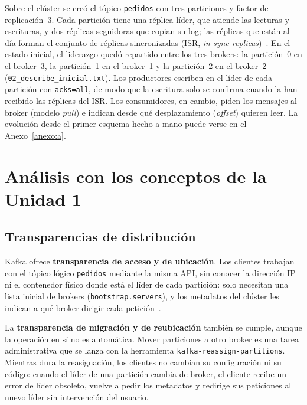\documentclass[12pt,a4paper]{article}
\begin{document}
Sobre el clúster se creó el tópico \texttt{pedidos} con tres particiones y factor de replicación~3. Cada partición tiene una réplica líder, que atiende las lecturas y escrituras, y dos réplicas seguidoras que copian su log; las réplicas que están al día forman el conjunto de réplicas sincronizadas (ISR, \textit{in-sync replicas})~\cite{Wang2015}. En el estado inicial, el liderazgo quedó repartido entre los tres brokers: la partición~0 en el broker~3, la partición~1 en el broker~1 y la partición~2 en el broker~2 (\texttt{02\_describe\_inicial.txt}). Los productores escriben en el líder de cada partición con \texttt{acks=all}, de modo que la escritura solo se confirma cuando la han recibido las réplicas del ISR. Los consumidores, en cambio, piden los mensajes al broker (modelo \textit{pull}) e indican desde qué desplazamiento (\textit{offset}) quieren leer. La evolución desde el primer esquema hecho a mano puede verse en el Anexo~\ref{anexo:a}.

\section{Análisis con los conceptos de la Unidad 1}\label{sec:unidad1}

\subsection{Transparencias de distribución}
Kafka ofrece \textbf{transparencia de acceso y de ubicación}. Los clientes trabajan con el tópico lógico \texttt{pedidos} mediante la misma API, sin conocer la dirección IP ni el contenedor físico donde está el líder de cada partición: solo necesitan una lista inicial de brokers (\texttt{bootstrap.servers}), y los metadatos del clúster les indican a qué broker dirigir cada petición~\cite{Raptis2023}.

La \textbf{transparencia de migración y de reubicación} también se cumple, aunque la operación en sí no es automática. Mover particiones a otro broker es una tarea administrativa que se lanza con la herramienta \texttt{kafka-reassign-partitions}. Mientras dura la reasignación, los clientes no cambian su configuración ni su código: cuando el líder de una partición cambia de broker, el cliente recibe un error de líder obsoleto, vuelve a pedir los metadatos y redirige sus peticiones al nuevo líder sin intervención del usuario.
\end{document}
